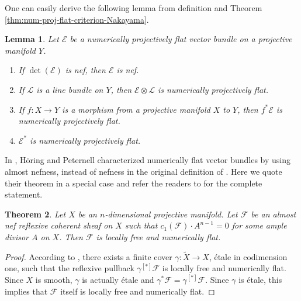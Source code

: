 \documentclass[english,reqno]{amsart}
\newcommand\sE{{\mathscr E}}
\newcommand\sF{{\mathscr F}}
\newcommand\sL{{\mathscr L}}
\theoremstyle{plain}
\newtheorem{thm}{Theorem}[section]
\newtheorem{lemma}[thm]{Lemma}
\theoremstyle{definition}
\numberwithin{equation}{section} %
\begin{document}
One can easily derive the following lemma from definition and Theorem \ref{thm:num-proj-flat-criterion-Nakayama}.

\begin{lemma}
    \label{lemma:prop-num-proj-flat}
    Let $\sE$ be a numerically projectively flat vector bundle on a projective manifold $Y$.
    \begin{enumerate}
        \item If $\det(\sE)$ is nef, then $\sE$ is nef.

        \item If $\sL$ is a line bundle on $Y$, then $\sE\otimes \sL$ is numerically projectively flat.

        \item If $f\colon X\rightarrow Y$ is a morphism from a projective manifold $X$ to $Y$, then $f^*\sE$ is numerically projectively flat.

        \item $\sE^*$ is numerically projectively flat.
    \end{enumerate}
\end{lemma}















In  \cite{HoeringPeternell2019}, H\"oring and Peternell characterized numerically flat vector bundles by using almost nefness, instead of nefness in the original definition of \cite{DemaillyPeternellSchneider1994}. Here we quote their theorem in a special case and  refer the readers to \cite{HoeringPeternell2019} for the complete statement.


\begin{thm}\cite[Theorem 1.8]{HoeringPeternell2019}\label{HP-Num-flatness}
    Let $X$ be an $n$-dimensional projective manifold. Let $\sF$ be an almost nef reflexive coherent sheaf on $X$ such that $c_1(\sF)\cdot A^{n-1}=0$ for some ample divisor $A$ on $X$. Then $\sF$ is locally free and numerically flat.
\end{thm}

\begin{proof}
    According to \cite[Theorem 1.8]{HoeringPeternell2019}, there exists a finite cover $\gamma\colon \widetilde{X}\rightarrow X$, \'etale in codimension one, such that the reflexive pullback $\gamma^{[*]}\sF$ is locally free and numerically flat. Since $X$ is smooth, $\gamma$ is actually \'etale and $\gamma^*\sF=\gamma^{[*]}\sF$. Since $\gamma$ is \'etale, this implies that $\sF$ itself is locally free and numerically flat.
\end{proof}
\end{document}
